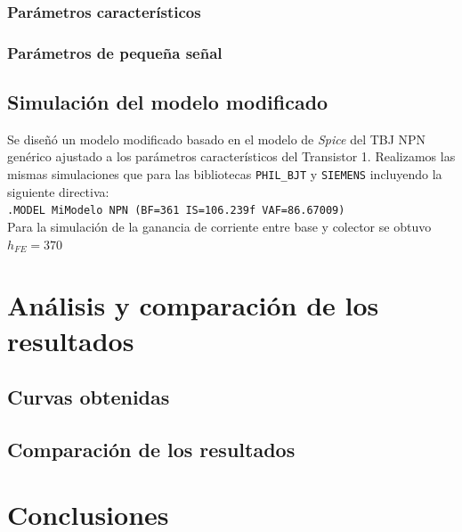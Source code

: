 \documentclass[10pt,spanish,a4paper,openany,notitlepage]{article}
\begin{document}
\subsubsection{Parámetros característicos}

\subsubsection{Parámetros de pequeña señal}



\subsection{Simulación del modelo modificado}

Se diseñó un modelo modificado basado en el modelo de \emph{Spice} del TBJ NPN genérico ajustado a los parámetros característicos del Transistor 1. Realizamos las mismas simulaciones que para las bibliotecas \texttt{PHIL\_BJT} y \texttt{SIEMENS} incluyendo la siguiente directiva:\\

\texttt{.MODEL MiModelo NPN (BF=361 IS=106.239f VAF=86.67009)}\\

Para la simulación de la ganancia de corriente entre base y colector se obtuvo $h_{FE} = 370$

\section{Análisis y comparación de los resultados}

\subsection{Curvas obtenidas}

\subsection{Comparación de los resultados}

\section{Conclusiones}
\end{document}
